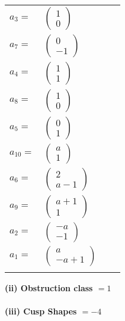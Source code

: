 \documentclass[1p]{elsarticle_modified}
\theoremstyle{definition}
\begin{document}
\begin{tabular}{m{7pt} m{180pt} m{7pt} m{180pt} }
\flushright $a_{3}=$&$\begin{pmatrix}1\\0\end{pmatrix}$ \\
\flushright $a_{7}=$&$\begin{pmatrix}0\\-1\end{pmatrix}$ \\
\flushright $a_{4}=$&$\begin{pmatrix}1\\1\end{pmatrix}$ \\
\flushright $a_{8}=$&$\begin{pmatrix}1\\0\end{pmatrix}$ \\
\flushright $a_{5}=$&$\begin{pmatrix}0\\1\end{pmatrix}$ \\
\flushright $a_{10}=$&$\begin{pmatrix}a\\1\end{pmatrix}$ \\
\flushright $a_{6}=$&$\begin{pmatrix}2\\a-1\end{pmatrix}$ \\
\flushright $a_{9}=$&$\begin{pmatrix}a+1\\1\end{pmatrix}$ \\
\flushright $a_{2}=$&$\begin{pmatrix}- a\\-1\end{pmatrix}$ \\
\flushright $a_{1}=$&$\begin{pmatrix}a\\- a+1\end{pmatrix}$\\&\end{tabular}
\flushleft \textbf{(ii) Obstruction class $= 1$}\\~\\
\flushleft \textbf{(iii) Cusp Shapes $= -4$}\\~\\
\end{document}
